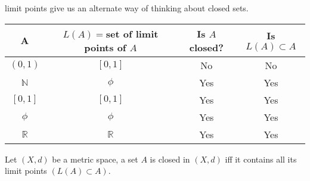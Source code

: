 \documentclass[12pt,a4paper]{article}
\begin{document}
limit points give us an alternate way of thinking about closed sets.

\begin{table}[htpb]
    \centering
    \begin{tabular}{|c|c|c|c|}
    \hline A & \(L(A)=\)set of limit points of \(A\) & Is \(A\) closed? & Is \(L(A) \subset A\) \\
    \hline \((0,1)\) & \([0,1]\) & No & No\\
    \hline \(\mathbb{N}\) & \(\phi\) & Yes & Yes\\
    \hline \([0,1]\) & \([0,1]\) & Yes & Yes\\
    \hline \(\phi\) & \(\phi\) & Yes & Yes\\
    \hline \(\mathbb{R}\) & \(\mathbb{R}\)   & Yes & Yes\\
    \hline                     
    \end{tabular}
\end{table}

Let \((X,d)\) be a metric space, a set \(A\) is closed in \((X,d)\) iff it contains all its limit points \((L(A)\subset A)\).    
\end{document}
